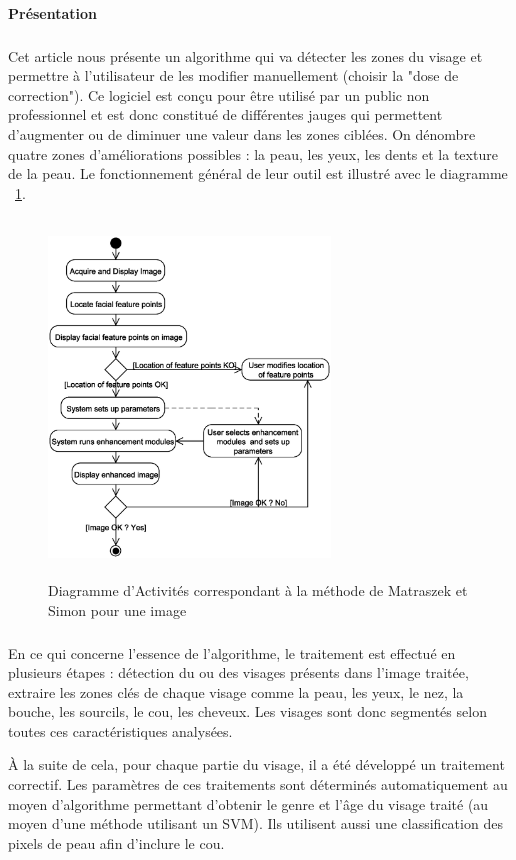 \documentclass[11pt, french]{report-rd-info}
\begin{document}
\paragraph{Présentation}
\subparagraph{}
Cet article nous présente un algorithme qui va détecter les zones du visage et permettre à l'utilisateur de les modifier manuellement (choisir la "dose de correction"). Ce logiciel est conçu pour être utilisé par un public non professionnel et est donc constitué de différentes jauges qui permettent d'augmenter ou de diminuer une valeur dans les zones ciblées. On dénombre quatre zones d'améliorations possibles : la peau, les yeux, les dents et la texture de la peau. Le fonctionnement général de leur outil est illustré avec le diagramme ~\ref{diag:diagrammebatch}.
\begin{figure}
\centering
\includegraphics[height=9.5cm,width=7.5cm]{Images/ActivityBatch.eps}
\caption{Diagramme d'Activités correspondant à la méthode de Matraszek et Simon \cite{Matraszek2004} pour une image}
\label{diag:diagrammebatch}
\end{figure}

\subparagraph{}
En ce qui concerne l’essence de l’algorithme, le traitement est effectué en plusieurs étapes : détection du ou des visages présents dans l’image traitée, extraire les zones clés de chaque visage comme la peau, les yeux, le nez, la bouche, les sourcils, le cou, les cheveux. Les visages sont donc segmentés selon toutes ces caractéristiques analysées. 

À la suite de cela, pour chaque partie du visage, il a été développé un traitement correctif. Les paramètres de ces traitements sont déterminés automatiquement au moyen d’algorithme permettant d’obtenir le genre et l’âge du visage traité (au moyen d’une méthode utilisant un SVM). Ils utilisent aussi une classification des pixels de peau afin d’inclure le cou.
\end{document}
